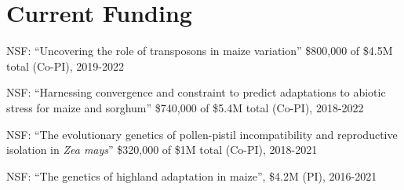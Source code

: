 \documentclass[letterpaper,10pt]{article}
\renewenvironment{itemize}{
  \begin{list}{}{
    \setlength{\leftmargin}{1.5em}
  }
}{
  \end{list}
}
\begin{document}
\section*{Current Funding}
\begin{itemize}
\setlength\itemsep{0ex}
 \item NSF: ``Uncovering the role of transposons in maize variation'' \$800,000 of \$4.5M total (Co-PI), 2019-2022%
 \item NSF: ``Harnessing convergence and constraint to predict adaptations to abiotic stress for maize and sorghum'' \$740,000 of \$5.4M total (Co-PI), 2018-2022
 \item NSF: ``The evolutionary genetics of pollen-pistil incompatibility and reproductive isolation in \textit{Zea mays}'' \$320,000 of \$1M total (Co-PI), 2018-2021
 \item NSF: ``The genetics of highland adaptation in maize'', \$4.2M (PI), 2016-2021

\end{itemize}
\end{document}
